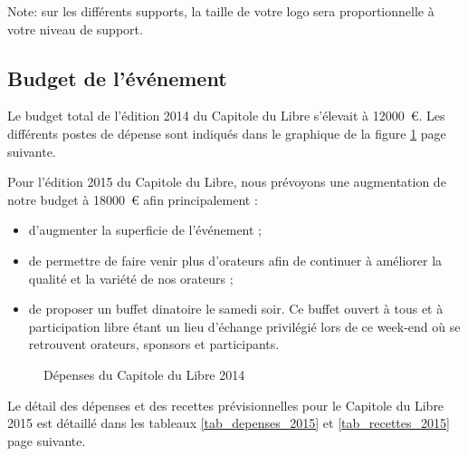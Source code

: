 Note: sur les différents supports, la taille de votre logo sera proportionnelle à votre niveau de support.

	\subsection{Budget de l’événement}

Le budget total de l'édition 2014 du Capitole du Libre s'élevait à \SI{12000}{\euro}. Les différents postes de dépense sont indiqués dans le graphique de la figure \ref{fig_budget} page suivante.

Pour l'édition 2015 du Capitole du Libre, nous prévoyons une augmentation de notre budget à \SI{18000}{€} afin principalement :
\begin{itemize}[label=$\bullet$]
\item d'augmenter la superficie de l'événement ;
\item de permettre de faire venir plus d'orateurs afin de continuer à améliorer la qualité et la variété de nos orateurs ;
\item de proposer un buffet dinatoire le samedi soir. Ce buffet ouvert à tous et à participation libre étant un lieu d'échange privilégié lors de ce week-end où se retrouvent orateurs, sponsors et participants.
\end{itemize}

\begin{figure}
\begin{center}
\end{center}
\caption{Dépenses du Capitole du Libre 2014}\label{fig_budget}
\end{figure}

\Separateur

Le détail des dépenses et des recettes prévisionnelles pour le Capitole du Libre 2015 est détaillé dans les tableaux \ref{tab_depenses_2015} et \ref{tab_recettes_2015} page suivante.


